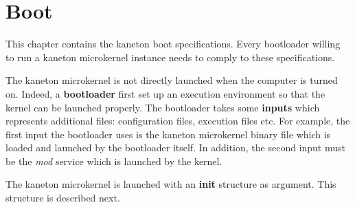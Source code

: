 %
%
%
%
%
%

%
%

\chapter{Boot}
\label{chapter:label}

This chapter contains the kaneton boot specifications. Every bootloader
willing to run a kaneton microkernel instance needs to comply to these
specifications.

\newpage

%
%

The kaneton microkernel is not directly launched when the computer is
turned on. Indeed, a \textbf{bootloader} first set up an execution environment
so that the kernel can be launched properly. The bootloader takes some
\textbf{inputs} which represents additional files: configuration files,
execution files etc. For example, the first input the bootloader uses is
the kaneton microkernel binary file which is loaded and launched by the
bootloader itself. In addition, the second input must be the \textit{mod}
service which is launched by the kernel.

The kaneton microkernel is launched with an \textbf{init} structure
as argument. This structure is described next.


